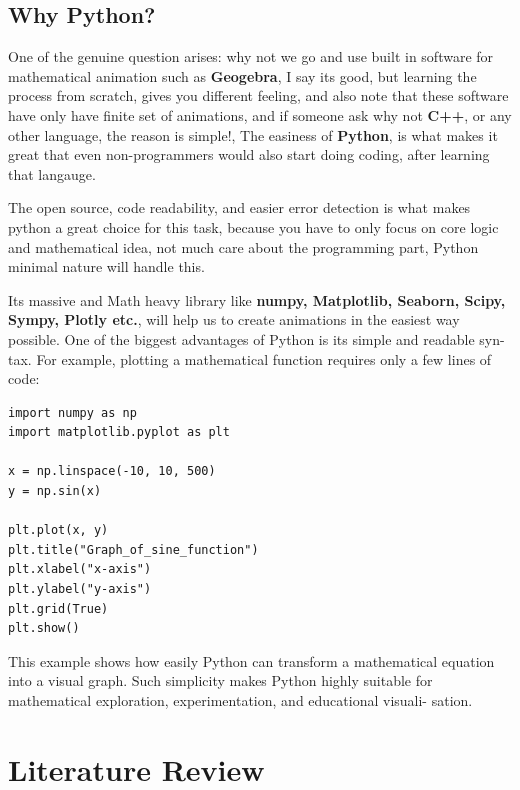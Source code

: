 \documentclass[12pt, a4paper]{report}
\begin{document}
\section{Why Python?}
 One of the genuine question arises:  why not we go and use built in software for mathematical animation such as \textbf{Geogebra}, I say its good, but learning the process from scratch, gives you different feeling, and also note that these software have only have finite set of animations, and if someone ask why not \textbf{C++}, or any other language, the reason is simple!, The easiness of \textbf{Python}, is what makes it great that even non-programmers would also start doing coding, after learning that langauge.

 The open source, code readability, and easier error detection is what makes python a great choice for this task, because you have to only focus on core logic and mathematical idea, not much care about the programming part, Python minimal nature will handle this.

 Its massive and Math heavy library like \textbf{numpy, Matplotlib, Seaborn, Scipy, Sympy, Plotly etc.}, will help us to create animations in the easiest way possible.
 One of the biggest advantages of Python is its simple and readable syn-
tax. For example, plotting a mathematical function requires only a few
lines of code:
\begin{lstlisting}
import numpy as np
import matplotlib.pyplot as plt

x = np.linspace(-10, 10, 500)
y = np.sin(x)

plt.plot(x, y)
plt.title("Graph_of_sine_function")
plt.xlabel("x-axis")
plt.ylabel("y-axis")
plt.grid(True)
plt.show()
\end{lstlisting}
 
This example shows how easily Python can transform a mathematical
equation into a visual graph. Such simplicity makes Python highly suitable
for mathematical exploration, experimentation, and educational visuali-
sation.


\chapter{Literature Review}
\end{document}
